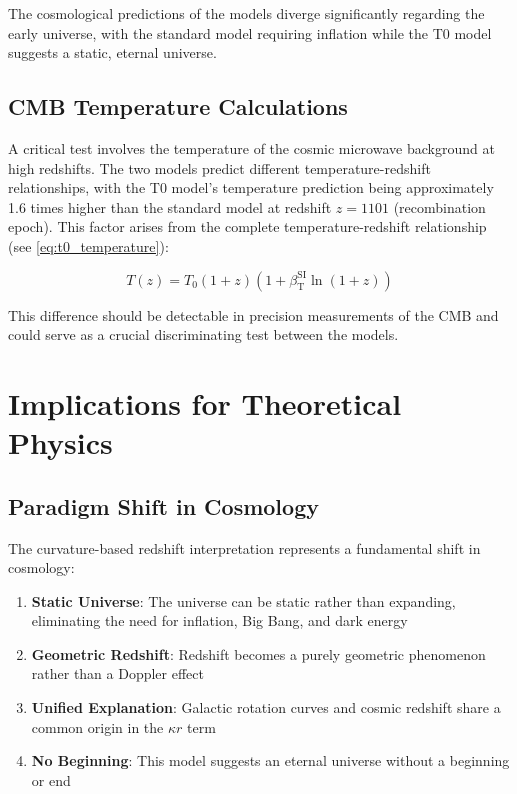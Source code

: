 \documentclass[12pt,a4paper]{article}
\newcommand{\betaT}{\beta_{\text{T}}}
\begin{document}
	The cosmological predictions of the models diverge significantly regarding the early universe, with the standard model requiring inflation\cite{guth1981} while the T0 model suggests a static, eternal universe\cite{pascher_part2_2025}.
	
	\subsection{CMB Temperature Calculations}
	\label{subsec:cmb_tests}
	
	A critical test involves the temperature of the cosmic microwave background at high redshifts\cite{fixsen2009}. The two models predict different temperature-redshift relationships\cite{pascher_temp_2025}, with the T0 model's temperature prediction being approximately 1.6 times higher than the standard model at redshift $z = 1101$ (recombination epoch). This factor arises from the complete temperature-redshift relationship (see \cref{eq:t0_temperature}):
	
	\begin{equation}
		\label{eq:detailed_temp}
		T(z) = T_0 (1+z)(1 + \betaT^{\text{SI}} \ln(1+z))
	\end{equation}
	
	This difference should be detectable in precision measurements of the CMB and could serve as a crucial discriminating test between the models\cite{pascher_temp_2025}.
	
	\section{Implications for Theoretical Physics}
	\label{sec:implications}
	
	\subsection{Paradigm Shift in Cosmology}
	\label{subsec:paradigm_shift}
	
	The curvature-based redshift interpretation represents a fundamental shift in cosmology\cite{pascher_vereinheitlichung_2025}:
	
	\begin{enumerate}
		\item \textbf{Static Universe}: The universe can be static rather than expanding\cite{einstein1917}, eliminating the need for inflation\cite{guth1981}, Big Bang\cite{hubble1929}, and dark energy\cite{perlmutter1999}
		\item \textbf{Geometric Redshift}: Redshift becomes a purely geometric phenomenon rather than a Doppler effect\cite{pascher_messdifferenzen_2025}
		\item \textbf{Unified Explanation}: Galactic rotation curves\cite{mcgaugh2016} and cosmic redshift share a common origin in the $\kappa r$ term\cite{pascher_emergente_gravitation_2025}
		\item \textbf{No Beginning}: This model suggests an eternal universe without a beginning or end\cite{pascher_part2_2025}
	\end{enumerate}
	
\end{document}
